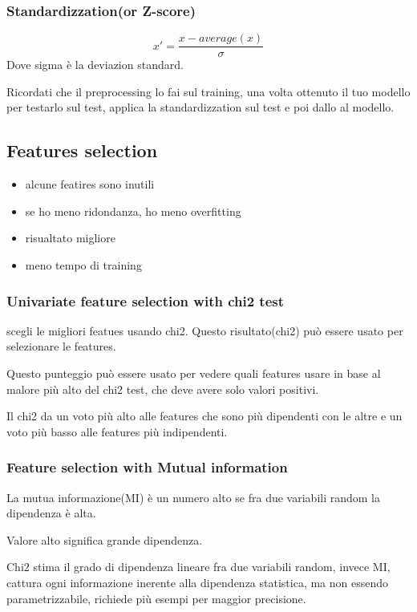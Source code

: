 \subsubsection{Standardizzation(or Z-score)}
\begin{equation}
    x'=\frac{x-average(x)}{\sigma}
\end{equation}
Dove sigma è la deviazion standard.

Ricordati che il preprocessing lo fai sul training, una volta ottenuto il tuo modello
per testarlo sul test, applica la standardizzation sul test e poi dallo al modello.

\subsection{Features selection}
\begin{itemize}
    \item alcune featires sono inutili
    \item se ho meno ridondanza, ho meno overfitting
    \item risualtato migliore
    \item meno tempo di training
\end{itemize}

\subsubsection{Univariate feature selection with chi2 test}
scegli le migliori featues usando chi2.
Questo risultato(chi2) può essere usato per selezionare le features.

Questo punteggio può essere usato per vedere quali features usare
in base al malore più alto del chi2 test, che deve avere solo valori positivi.

Il chi2 da un voto più alto alle features che sono più dipendenti con le altre
e un voto più basso alle features più indipendenti.


\subsubsection{Feature selection with Mutual information}
La mutua informazione(MI) è un numero alto se fra due variabili random
la dipendenza è alta.

Valore alto significa grande dipendenza.



Chi2 stima il grado di dipendenza lineare fra due variabili random, invece MI,
cattura ogni informazione inerente alla dipendenza statistica,
ma non essendo parametrizzabile, richiede più esempi per maggior precisione.

